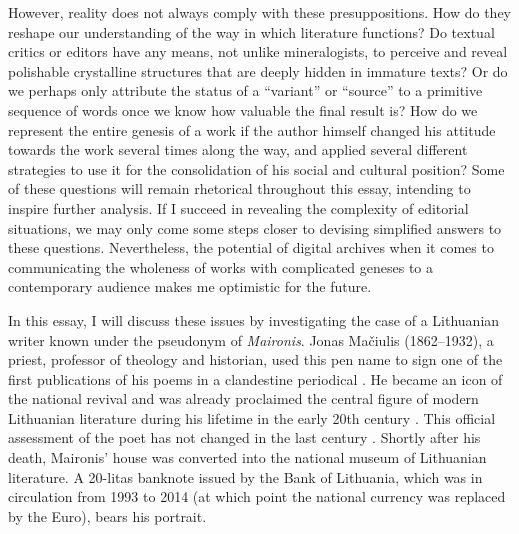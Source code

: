 \begin{paper}
However, reality does not always comply with these
presuppositions. How do they reshape our understanding of the way in which literature functions? Do textual
critics or editors have any means, not unlike mineralogists, to perceive and
reveal polishable crystalline structures that are deeply hidden in immature texts?
Or do we perhaps only 
attribute the status of a ``variant'' or ``source'' to a primitive sequence of
words once we know how valuable the final result is? How do we represent the entire genesis of a work if the
author himself changed his attitude towards the work several times along the way, and
applied several different strategies to use it for the consolidation of his
social and cultural position? Some of these questions will remain
rhetorical throughout this essay, intending to inspire further analysis. If I succeed in revealing the
complexity of editorial situations, we may only come some steps closer to devising
simplified answers to these questions. Nevertheless, the potential of digital archives when it comes to  communicating the wholeness of works with complicated geneses to a contemporary audience makes me optimistic for the future.

In this essay, I will discuss these issues by investigating the case of a
Lithuanian writer known under the pseudonym of \emph{Maironis}. Jonas
Mačiulis (1862--1932), a priest, professor of theology and historian,
used this pen name to sign one of the first publications of his poems in
a clandestine periodical \citep{maironis_daina_1891}. He became an icon of the
national revival and was already proclaimed the central figure of modern
Lithuanian literature during his lifetime in the early 20th century \citep[54--55]{seina_maironio_2016}. This official assessment of the poet has not
changed in the last century \citep[see][184--87]{kalnacs_300_2009}. Shortly
after his death, Maironis' house was converted into the national museum
of Lithuanian literature. A 20-litas banknote issued by the Bank of
Lithuania, which was in circulation from 1993 to 2014 (at which point the
national currency was replaced by the Euro), bears his portrait.


\end{paper}

